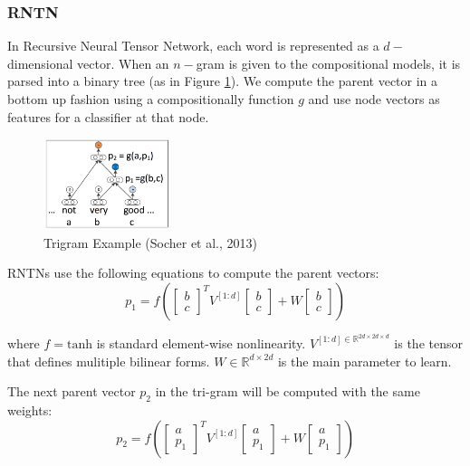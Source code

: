 \subsubsection{RNTN}
In Recursive Neural Tensor Network, each word is represented as a $d-$dimensional vector. When an $n-$gram is given to the compositional models, it is parsed into a binary tree (as in Figure \ref{trigram}). We compute the parent vector in a bottom up fashion using a compositionally function $g$ and use node vectors as features for a classifier at that node. 
\begin{figure}[H]
\begin{center}
\includegraphics[width = 0.33\textwidth]{pic/trigram.png}
\caption{\label{trigram}Trigram Example (Socher et al., 2013) }
\end{center}
\end{figure}

RNTNs use the following equations to compute the parent vectors: 
\begin{equation*}
p_1 = f \left(  
\begin{bmatrix}
b \\ c
\end{bmatrix}^T
V^{[1:d]} 
\begin{bmatrix}
b \\ c
\end{bmatrix}
+ W
\begin{bmatrix}
b \\ c
\end{bmatrix}
 \right)
\end{equation*}
 
where $f = \textrm{tanh}$ is standard element-wise nonlinearity. $V^{[1:d] \in \mathbb{R}^{2d \times 2d \times d}}$ is the tensor that defines mulitiple bilinear forms. $W \in \mathbb{R}^{d \times 2d}$ is the main parameter to learn. 

The next parent vector $p_2$ in the tri-gram will be computed with the same weights:
\begin{equation*}
p_2 = f \left(  
\begin{bmatrix}
a \\ p_1
\end{bmatrix}^T
V^{[1:d]} 
\begin{bmatrix}
a \\ p_1
\end{bmatrix}
+ W
\begin{bmatrix}
a \\ p_1
\end{bmatrix}
 \right)
\end{equation*}

